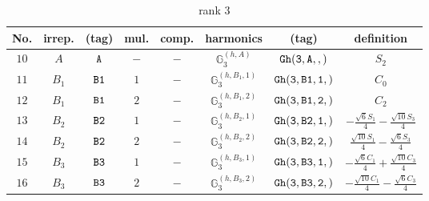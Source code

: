 \documentclass[fleqn,8pt]{jsarticle}
\begin{document}
\begin{table}[ht!]
\begin{center}
\caption{rank 3}
\renewcommand{\arraystretch}{1.3}
\begin{tabular}{cccccccc} \hline \hline
No. & irrep. & (tag) & mul. & comp. & harmonics & (tag) & definition \\ \hline
$ 10 $ & $ A $ & $ {\tt A} $ & $ - $ & $ - $ & $ \mathbb{G}_{3}^{(h,A)} $ & $ {\tt Gh(3,A,,)} $ & $ S_{2} $ \\
$ 11 $ & $ B_{1} $ & $ {\tt B1} $ & $ 1 $ & $ - $ & $ \mathbb{G}_{3}^{(h,B_{1},1)} $ & $ {\tt Gh(3,B1,1,)} $ & $ C_{0} $ \\
$ 12 $ & $ B_{1} $ & $ {\tt B1} $ & $ 2 $ & $ - $ & $ \mathbb{G}_{3}^{(h,B_{1},2)} $ & $ {\tt Gh(3,B1,2,)} $ & $ C_{2} $ \\
$ 13 $ & $ B_{2} $ & $ {\tt B2} $ & $ 1 $ & $ - $ & $ \mathbb{G}_{3}^{(h,B_{2},1)} $ & $ {\tt Gh(3,B2,1,)} $ & $ - \frac{\sqrt{6} S_{1}}{4} - \frac{\sqrt{10} S_{3}}{4} $ \\
$ 14 $ & $ B_{2} $ & $ {\tt B2} $ & $ 2 $ & $ - $ & $ \mathbb{G}_{3}^{(h,B_{2},2)} $ & $ {\tt Gh(3,B2,2,)} $ & $ \frac{\sqrt{10} S_{1}}{4} - \frac{\sqrt{6} S_{3}}{4} $ \\
$ 15 $ & $ B_{3} $ & $ {\tt B3} $ & $ 1 $ & $ - $ & $ \mathbb{G}_{3}^{(h,B_{3},1)} $ & $ {\tt Gh(3,B3,1,)} $ & $ - \frac{\sqrt{6} C_{1}}{4} + \frac{\sqrt{10} C_{3}}{4} $ \\
$ 16 $ & $ B_{3} $ & $ {\tt B3} $ & $ 2 $ & $ - $ & $ \mathbb{G}_{3}^{(h,B_{3},2)} $ & $ {\tt Gh(3,B3,2,)} $ & $ - \frac{\sqrt{10} C_{1}}{4} - \frac{\sqrt{6} C_{3}}{4} $ \\
 \hline \hline
\end{tabular}
\end{center}
\end{table}
\end{document}
